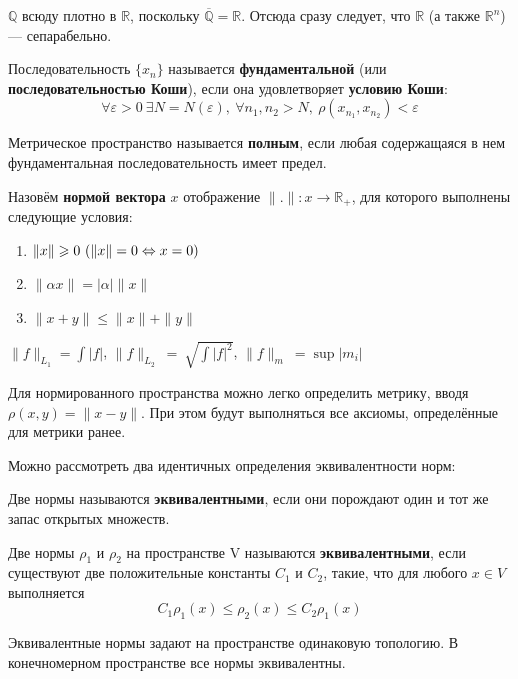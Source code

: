 \documentclass[12pt]{article}
\begin{document}
		\example $\mathbb{Q}$ всюду плотно в $\mathbb{R}$, поскольку $\overline{\mathbb{Q}} = \mathbb{R}$.
		Отсюда сразу следует, что $\mathbb{R}$ (а также $\mathbb{R}^n$) --- сепарабельно.

		\begin{defi}
			Последовательность $\{x_n\}$ называется \textbf{фундаментальной} (или \textbf{последовательностью Коши}), если она 
			удовлетворяет \textbf{условию Коши}:
			$$\forall \varepsilon > 0 ~\exists N = N(\varepsilon),~ \forall n_1, n_2 > N,~ \rho(x_{n_1}, x_{n_2}) < \varepsilon$$
		\end{defi}

		\begin{defi}
			Метрическое пространство называется \textbf{полным}, если любая содержащаяся в нем фундаментальная последовательность имеет 
			предел.
		\end{defi}

		\begin{defi}
			Назовём \textbf{нормой вектора} $x$ отображение $\|.\| : x \rightarrow \mathbb{R_+}$, для которого выполнены следующие условия:
			\begin{enumerate}
				\item $\|x\| \geqslant 0 ~(\|x\| = 0 \Leftrightarrow x = 0)$
				\item $\|\alpha x\| = |\alpha| \|x\|$
				\item $\|x + y\| \leq \|x\| + \|y\|$
			\end{enumerate}
		\end{defi}
	
		\example $\|f\|_{L_1} = \int {|f|}$, $\|f\|_{L_2} ~=~ \sqrt{\int {|f|^2}}$,  $\|f\|_{m} ~= \sup {|m_i|}$
	
		Для нормированного пространства можно легко определить метрику, вводя $\rho(x,y) = \|x-y\|$. При этом будут выполняться все аксиомы,
		определённые для метрики ранее.
	
		Можно рассмотреть два идентичных определения эквивалентности норм:
	
		\begin{defi}
			Две нормы называются \textbf{эквивалентными}, если они порождают один и тот же запас открытых множеств.
		\end{defi}
	
		\begin{defi}
			Две нормы $\rho_1$ и $\rho_2$ на пространстве V называются \textbf{эквивалентными}, если существуют две положительные константы 
			$C_1$ и $C_2$, такие, что для любого $x \in V$ выполняется 
			$$C_1 \rho_1(x) \leq \rho_2(x) \leq C_2 \rho_1(x)$$
		\end{defi}
		Эквивалентные нормы задают на пространстве одинаковую топологию. В конечномерном пространстве все нормы эквивалентны.
	
\end{document}
